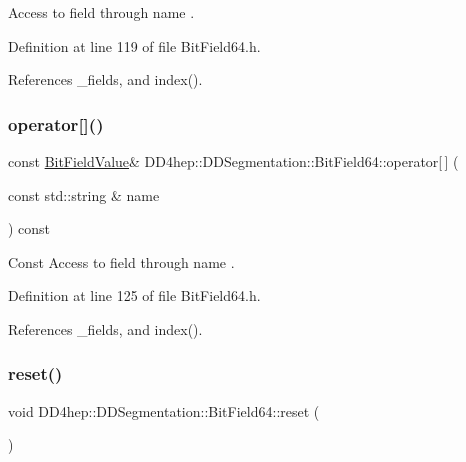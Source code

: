 Access to field through name . 

Definition at line 119 of file Bit\+Field64.\+h.



References \+\_\+fields, and index().

\hypertarget{class_d_d4hep_1_1_d_d_segmentation_1_1_bit_field64_a343b116d9e7b540563387abb6e73133d}{}\label{class_d_d4hep_1_1_d_d_segmentation_1_1_bit_field64_a343b116d9e7b540563387abb6e73133d} 
\subsubsection{\texorpdfstring{operator[]()}{operator[]()}\hspace{0.1cm}{\footnotesize\ttfamily [4/4]}}
{\footnotesize\ttfamily const \hyperlink{class_d_d4hep_1_1_d_d_segmentation_1_1_bit_field_value}{Bit\+Field\+Value}\& D\+D4hep\+::\+D\+D\+Segmentation\+::\+Bit\+Field64\+::operator\mbox{[}$\,$\mbox{]} (\begin{DoxyParamCaption}\item[{const std\+::string \&}]{name }\end{DoxyParamCaption}) const\hspace{0.3cm}{\ttfamily [inline]}}

Const Access to field through name . 

Definition at line 125 of file Bit\+Field64.\+h.



References \+\_\+fields, and index().

\hypertarget{class_d_d4hep_1_1_d_d_segmentation_1_1_bit_field64_af9f7362c6d23d8cce8669f8611def7e5}{}\label{class_d_d4hep_1_1_d_d_segmentation_1_1_bit_field64_af9f7362c6d23d8cce8669f8611def7e5} 
\subsubsection{\texorpdfstring{reset()}{reset()}}
{\footnotesize\ttfamily void D\+D4hep\+::\+D\+D\+Segmentation\+::\+Bit\+Field64\+::reset (\begin{DoxyParamCaption}{ }\end{DoxyParamCaption})\hspace{0.3cm}{\ttfamily [inline]}}

